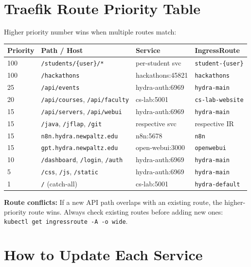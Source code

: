 \documentclass[11pt,a4paper]{article}
\begin{document}
\section{Traefik Route Priority Table}

Higher priority number wins when multiple routes match:

\begin{longtable}{lllp{3cm}}
\toprule
\textbf{Priority} & \textbf{Path / Host} & \textbf{Service} & \textbf{IngressRoute} \\
\midrule
\endhead
100 & \texttt{/students/\{user\}/*} & per-student svc & \texttt{student-\{user\}} \\
100 & \texttt{/hackathons} & hackathons:45821 & \texttt{hackathons} \\
25 & \texttt{/api/events} & hydra-auth:6969 & \texttt{hydra-main} \\
20 & \texttt{/api/courses}, \texttt{/api/faculty} & cs-lab:5001 & \texttt{cs-lab-website} \\
15 & \texttt{/api/servers}, \texttt{/api/webui} & hydra-auth:6969 & \texttt{hydra-main} \\
15 & \texttt{/java}, \texttt{/jflap}, \texttt{/git} & respective svc & respective IR \\
15 & \texttt{n8n.hydra.newpaltz.edu} & n8n:5678 & \texttt{n8n} \\
15 & \texttt{gpt.hydra.newpaltz.edu} & open-webui:3000 & \texttt{openwebui} \\
10 & \texttt{/dashboard}, \texttt{/login}, \texttt{/auth} & hydra-auth:6969 & \texttt{hydra-main} \\
5 & \texttt{/css}, \texttt{/js}, \texttt{/static} & hydra-auth:6969 & \texttt{hydra-main} \\
1 & \texttt{/} (catch-all) & cs-lab:5001 & \texttt{hydra-default} \\
\bottomrule
\end{longtable}

\begin{warningbox}
\textbf{Route conflicts:} If a new API path overlaps with an existing route, the higher-priority route wins. Always check existing routes before adding new ones: \texttt{kubectl get ingressroute -A -o wide}.
\end{warningbox}

\section{How to Update Each Service}
\end{document}

